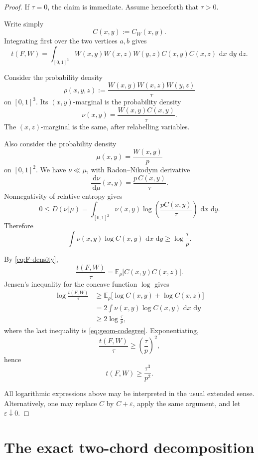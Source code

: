 \documentclass[11pt]{article}
\newcommand{\dd}{\,\mathrm{d}}
\begin{document}
\begin{proof}
If \(\tau=0\), the claim is immediate.  Assume henceforth that
\(\tau>0\).

Write simply
\[
C(x,y):=C_W(x,y).
\]
Integrating first over the two vertices \(a,b\) gives
\begin{equation}\label{eq:F-density}
t(F,W)
=
\int_{[0,1]^3}
W(x,y)W(x,z)W(y,z)
C(x,y)C(x,z)
\,\dd x\,\dd y\,\dd z.
\end{equation}

Consider the probability density
\[
\rho(x,y,z)
:=
\frac{
W(x,y)W(x,z)W(y,z)
}{\tau}
\]
on \([0,1]^3\).
Its \((x,y)\)-marginal is the probability density
\[
\nu(x,y)
=
\frac{W(x,y)C(x,y)}{\tau}.
\]
The \((x,z)\)-marginal is the same, after relabelling variables.

Also consider the probability density
\[
\mu(x,y)
=
\frac{W(x,y)}{p}
\]
on \([0,1]^2\).
We have \(\nu\ll\mu\), with Radon--Nikodym derivative
\[
\frac{\dd\nu}{\dd\mu}(x,y)
=
\frac{p\,C(x,y)}{\tau}.
\]
Nonnegativity of relative entropy gives
\[
0
\le
D(\nu\Vert\mu)
=
\int_{[0,1]^2}
\nu(x,y)
\log\left(
\frac{pC(x,y)}{\tau}
\right)
\,\dd x\,\dd y.
\]
Therefore
\begin{equation}\label{eq:geom-codegree}
\int\nu(x,y)\log C(x,y)\,\dd x\,\dd y
\ge
\log\frac{\tau}{p}.
\end{equation}

By \eqref{eq:F-density},
\[
\frac{t(F,W)}{\tau}
=
\mathbb E_\rho
\bigl[
C(x,y)C(x,z)
\bigr].
\]
Jensen's inequality for the concave function \(\log\) gives
\[
\begin{aligned}
\log\frac{t(F,W)}{\tau}
&\ge
\mathbb E_\rho
\bigl[
\log C(x,y)+\log C(x,z)
\bigr]\\
&=
2\int\nu(x,y)\log C(x,y)\,\dd x\,\dd y\\
&\ge
2\log\frac{\tau}{p},
\end{aligned}
\]
where the last inequality is \eqref{eq:geom-codegree}.
Exponentiating,
\[
\frac{t(F,W)}{\tau}
\ge
\left(\frac{\tau}{p}\right)^2,
\]
hence
\[
t(F,W)\ge\frac{\tau^3}{p^2}.
\]

All logarithmic expressions above may be interpreted in the usual
extended sense.  Alternatively, one may replace \(C\) by
\(C+\varepsilon\), apply the same argument, and let
\(\varepsilon\downarrow0\).
\end{proof}

\section{The exact two-chord decomposition}
\end{document}
